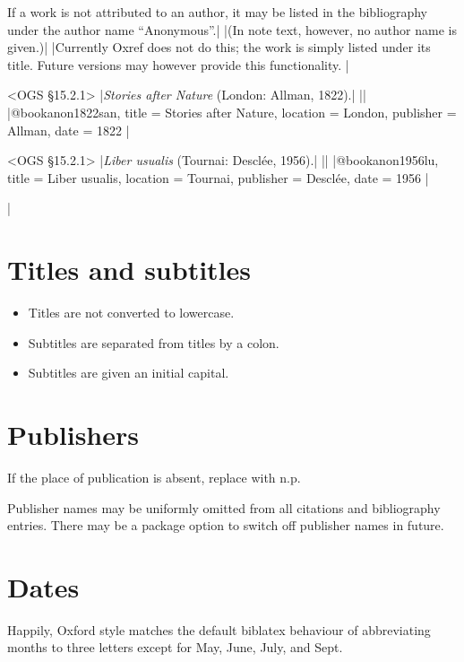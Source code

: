 \documentclass[extrafontsizes,11pt,a4paper,oneside]{memoir}
\begin{document}
If a work is not attributed to an author, it may be listed in the bibliography
under the author name \enquote{Anonymous}.|
\todoc[oxnotes]|(In note text, however, no author name is given.)|
\todoc|Currently Oxref does not do this; the work is simply listed under its title.
Future versions may however provide this functionality.
|

\bibexample<OGS \S15.2.1>
|\emph{Stories after Nature} (London: Allman, 1822).|%
||%
|@book{anon1822san,
  title = {Stories after Nature},
  location = {London},
  publisher = {Allman},
  date = {1822}
}|

\bibexample<OGS \S15.2.1>
|\emph{Liber usualis} (Tournai: Desclée, 1956).|%
||%
|@book{anon1956lu,
  title = {Liber usualis},
  location = {Tournai},
  publisher = {Desclée},
  date = {1956}
}|

\todoc|

\section{Titles and subtitles}

\begin{itemize}
  \item
  Titles are not converted to lowercase.
  
  \item
  Subtitles are separated from titles by a colon.
  
  \item
  Subtitles are given an initial capital.
  \par{}
\end{itemize}

\section{Publishers}

If the place of publication is absent, replace with n.p.

Publisher names may be uniformly omitted from all citations and bibliography entries.
There may be a package option to switch off publisher names in future.

\section{Dates}

Happily, Oxford style matches the default \textsf{biblatex} behaviour of
abbreviating months to three letters except for May, June, July, and Sept.
\end{document}
